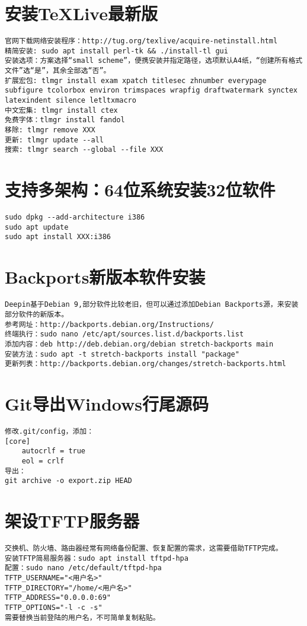 \documentclass[a4paper,fontset=fandol,zihao=-4,linespread=1.2]{ctexbook}
\begin{document}
\section{安装TeXLive最新版}
\begin{lstlisting}
官网下载网络安装程序：http://tug.org/texlive/acquire-netinstall.html
精简安装: sudo apt install perl-tk && ./install-tl gui
安装选项：方案选择“small scheme”，便携安装并指定路径，选项默认A4纸，“创建所有格式文件”选“是”，其余全部选“否”。
扩展宏包: tlmgr install exam xpatch titlesec zhnumber everypage subfigure tcolorbox environ trimspaces wrapfig draftwatermark synctex latexindent silence letltxmacro
中文宏集: tlmgr install ctex
免费字体：tlmgr install fandol
移除: tlmgr remove XXX
更新: tlmgr update --all
搜索: tlmgr search --global --file XXX
\end{lstlisting}

\section{支持多架构：64位系统安装32位软件}
\begin{lstlisting}
sudo dpkg --add-architecture i386
sudo apt update
sudo apt install XXX:i386
\end{lstlisting}

\section{Backports新版本软件安装}
\begin{lstlisting}
Deepin基于Debian 9,部分软件比较老旧，但可以通过添加Debian Backports源，来安装部分软件的新版本。
参考网址：http://backports.debian.org/Instructions/
终端执行：sudo nano /etc/apt/sources.list.d/backports.list
添加内容：deb http://deb.debian.org/debian stretch-backports main
安装方法：sudo apt -t stretch-backports install "package"
更新列表：http://backports.debian.org/changes/stretch-backports.html
\end{lstlisting}

\section{Git导出Windows行尾源码}
\begin{lstlisting}
修改.git/config，添加：
[core]
	autocrlf = true
	eol = crlf
导出：
git archive -o export.zip HEAD
\end{lstlisting}

\section{架设TFTP服务器}
\begin{lstlisting}
交换机、防火墙、路由器经常有网络备份配置、恢复配置的需求，这需要借助TFTP完成。
安装TFTP简易服务器：sudo apt install tftpd-hpa
配置：sudo nano /etc/default/tftpd-hpa
TFTP_USERNAME="<用户名>"
TFTP_DIRECTORY="/home/<用户名>"
TFTP_ADDRESS="0.0.0.0:69"
TFTP_OPTIONS="-l -c -s"
需要替换当前登陆的用户名，不可简单复制粘贴。
\end{lstlisting}
\end{document}
